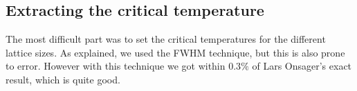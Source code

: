 \documentclass[../main.tex]{subfiles}
\begin{document}
\subsection{Extracting the critical temperature}
The most difficult part was to set the critical temperatures for the different lattice sizes. As explained, we used the FWHM technique, but this is also prone to error. However with this technique we got within $0.3\%$ of Lars Onsager's exact result, which is quite good.
\end{document}
